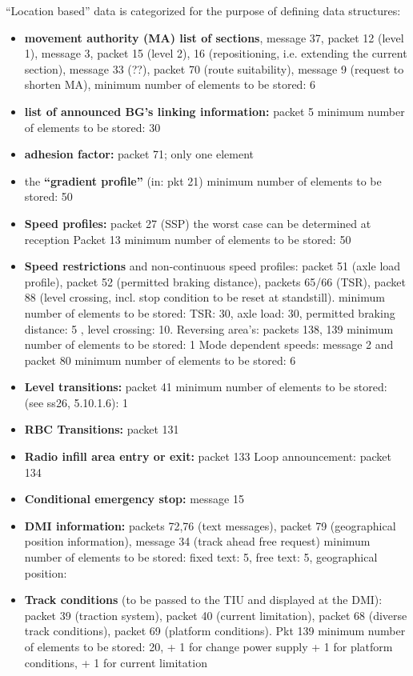 \documentclass{template/openetcs_report}
\begin{document}
“Location based” data is categorized for the purpose of defining data structures:
\begin{itemize}
\item \textbf{movement authority (MA) list of sections}, message 37, packet 12 (level 1), message 3, packet 15 (level 2), 16 (repositioning, i.e. extending the current section), message 33 (??), packet 70 (route suitability), message 9 (request to shorten MA),    minimum number of elements to be stored: 6
\item \textbf{list of announced BG's linking information:} packet 5  minimum number of elements to be stored: 30
\item \textbf{adhesion factor:} packet 71;  only one element
\item the \textbf{“gradient profile”} (in: pkt 21)  minimum number of elements to be stored: 50
\item \textbf{Speed profiles:}  packet 27 (SSP)  {the worst case can be determined at reception} 
Packet 13	minimum number of elements to be stored: 50
\item \textbf{Speed restrictions} and non-continuous speed profiles: packet 51 (axle load profile), packet 52 (permitted braking distance), packets 65/66 (TSR), packet 88 (level crossing, incl. stop condition to be reset at standstill).  
minimum number of elements to be stored: TSR: 30, axle load: 30, permitted braking distance:  5 , level crossing: 10. 
Reversing area's: packets 138, 139	minimum number of elements to be stored: 1
Mode dependent speeds: message 2  and packet 80  minimum number of elements to be stored: 6
\item \textbf{Level transitions:} packet 41  minimum number of elements to be stored:  (see ss26, 5.10.1.6): 1
\item \textbf{RBC Transitions:} packet 131
\item \textbf{Radio infill area entry or exit:} packet 133
Loop announcement: packet 134
\item \textbf{Conditional emergency stop:} message 15
\item \textbf{DMI information:} packets 72,76 (text messages), packet 79 (geographical position information), message 34 (track ahead free request)  minimum number of elements to be stored: fixed text: 5, free text: 5, geographical position: 
\item \textbf{Track conditions} (to be passed to the TIU and displayed at the DMI): packet 39 (traction system), packet 40 (current limitation),  packet 68 (diverse track conditions), packet 69 (platform conditions). Pkt 139  minimum number of elements to be stored: 20, + 1 for change power supply + 1 for platform conditions, + 1 for current limitation

\end{itemize}
\end{document}
